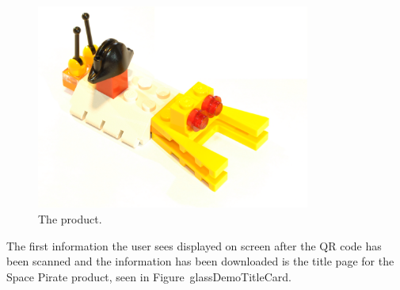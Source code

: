 	\begin{figure}[ht!]
		\centering
		\includegraphics[width=90mm]{images/rawImages/BILD_6}
		\caption{The product.}
		\label{glassDemoRaw}
	\end{figure}

The first information the user sees displayed on screen after the QR code has been scanned and the information has been downloaded is the title page for the Space Pirate product, seen in Figure~{glassDemoTitleCard}.

	

